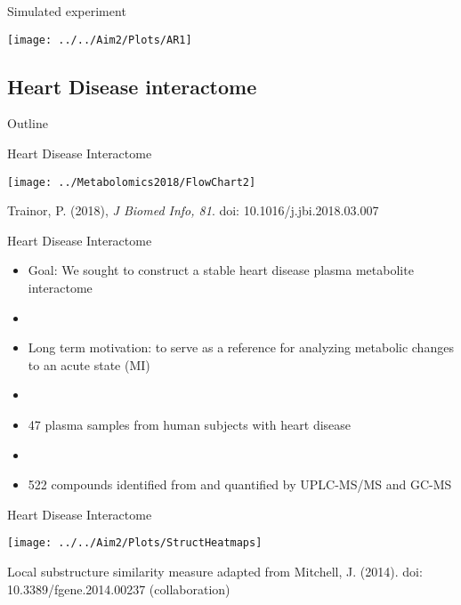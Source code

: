 \documentclass[xcolor=dvipsnames]{beamer}
\begin{document}
\begin{frame}{Simulated experiment}
	\begin{center}
		\texttt{[image: ../../Aim2/Plots/AR1]}
	\end{center}
\end{frame}

\subsection{Heart Disease interactome}

\begin{frame}{Outline}
\vspace{-10.5pt}
\tableofcontents[currentsection,subsectionstyle=show/shaded/hide]
\addtocounter{framenumber}{-1}
\end{frame}

\begin{frame}{Heart Disease Interactome}
\vspace{-10 pt}
		\begin{center}
		\texttt{[image: ../Metabolomics2018/FlowChart2]}
		
		Trainor, P. (2018), \emph{J Biomed Info, 81}. doi: 10.1016/j.jbi.2018.03.007
	\end{center}
\end{frame}

\begin{frame}{Heart Disease Interactome}
	\vspace{-15.5pt}
	\begin{itemize}
		\item Goal: We sought to construct a stable heart disease plasma metabolite interactome \pause
		\item[]
		\item Long term motivation:  to serve as a reference for analyzing metabolic changes to an acute state (MI) \pause
		\item[]
		\item 47 plasma samples from human subjects with heart disease \pause
		\item[]
		\item 522 compounds identified from and quantified by UPLC-MS/MS and GC-MS
	\end{itemize}
\end{frame}

\begin{frame}{Heart Disease Interactome}
		\vspace{-15.5pt}
	\begin{center}
		\texttt{[image: ../../Aim2/Plots/StructHeatmaps]}
		
		Local substructure similarity measure adapted from Mitchell, J. (2014). doi: 10.3389/fgene.2014.00237 (collaboration)
	\end{center}
\end{frame}
\end{document}
